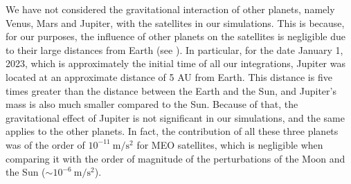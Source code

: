 \documentclass[../main.tex]{subfiles}
\begin{document}
We have not considered the gravitational interaction of other planets, namely Venus, Mars and Jupiter, with the satellites in our simulations. This is because, for our purposes, the influence of other planets on the satellites is negligible due to their large distances from Earth (see \cite{montenbruck}). In particular, for the date January 1, 2023, which is approximately the initial time of all our integrations, Jupiter was located at an approximate distance of 5 AU from Earth. This distance is five times greater than the distance between the Earth and the Sun, and Jupiter's mass is also much smaller compared to the Sun. Because of that, the gravitational effect of Jupiter is not significant in our simulations, and the same applies to the other planets. In fact, the contribution of all these three planets was of the order of $10^{-11}\ \mathrm{m/s^2}$ for MEO satellites, which is negligible when comparing it with the order of magnitude of the perturbations of the Moon and the Sun ($\sim 10^{-6}\ \mathrm{m/s^2}$).
\end{document}
